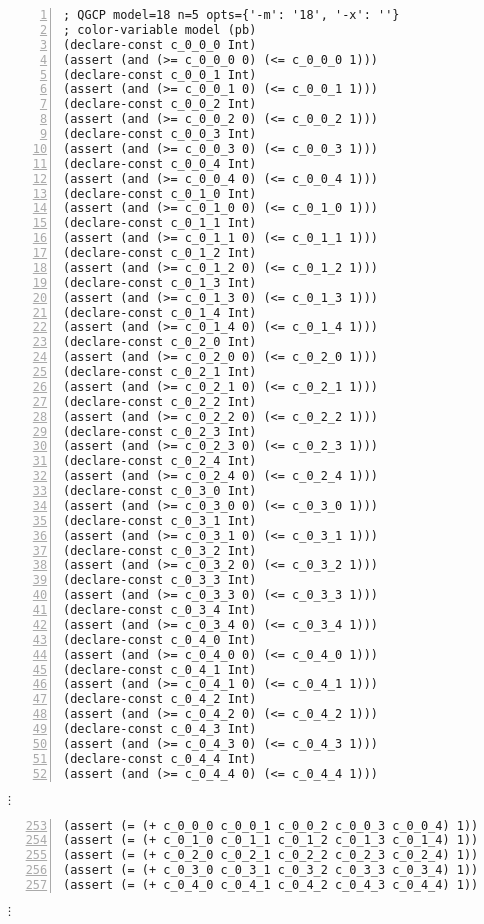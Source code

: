 \begin{lstlisting}[frame=trl,numbers=left,breaklines=true,%
columns=fullflexible,keepspaces=true,%
basicstyle=\ttfamily\scriptsize]
; QGCP model=18 n=5 opts={'-m': '18', '-x': ''}
; color-variable model (pb)
(declare-const c_0_0_0 Int)
(assert (and (>= c_0_0_0 0) (<= c_0_0_0 1)))
(declare-const c_0_0_1 Int)
(assert (and (>= c_0_0_1 0) (<= c_0_0_1 1)))
(declare-const c_0_0_2 Int)
(assert (and (>= c_0_0_2 0) (<= c_0_0_2 1)))
(declare-const c_0_0_3 Int)
(assert (and (>= c_0_0_3 0) (<= c_0_0_3 1)))
(declare-const c_0_0_4 Int)
(assert (and (>= c_0_0_4 0) (<= c_0_0_4 1)))
(declare-const c_0_1_0 Int)
(assert (and (>= c_0_1_0 0) (<= c_0_1_0 1)))
(declare-const c_0_1_1 Int)
(assert (and (>= c_0_1_1 0) (<= c_0_1_1 1)))
(declare-const c_0_1_2 Int)
(assert (and (>= c_0_1_2 0) (<= c_0_1_2 1)))
(declare-const c_0_1_3 Int)
(assert (and (>= c_0_1_3 0) (<= c_0_1_3 1)))
(declare-const c_0_1_4 Int)
(assert (and (>= c_0_1_4 0) (<= c_0_1_4 1)))
(declare-const c_0_2_0 Int)
(assert (and (>= c_0_2_0 0) (<= c_0_2_0 1)))
(declare-const c_0_2_1 Int)
(assert (and (>= c_0_2_1 0) (<= c_0_2_1 1)))
(declare-const c_0_2_2 Int)
(assert (and (>= c_0_2_2 0) (<= c_0_2_2 1)))
(declare-const c_0_2_3 Int)
(assert (and (>= c_0_2_3 0) (<= c_0_2_3 1)))
(declare-const c_0_2_4 Int)
(assert (and (>= c_0_2_4 0) (<= c_0_2_4 1)))
(declare-const c_0_3_0 Int)
(assert (and (>= c_0_3_0 0) (<= c_0_3_0 1)))
(declare-const c_0_3_1 Int)
(assert (and (>= c_0_3_1 0) (<= c_0_3_1 1)))
(declare-const c_0_3_2 Int)
(assert (and (>= c_0_3_2 0) (<= c_0_3_2 1)))
(declare-const c_0_3_3 Int)
(assert (and (>= c_0_3_3 0) (<= c_0_3_3 1)))
(declare-const c_0_3_4 Int)
(assert (and (>= c_0_3_4 0) (<= c_0_3_4 1)))
(declare-const c_0_4_0 Int)
(assert (and (>= c_0_4_0 0) (<= c_0_4_0 1)))
(declare-const c_0_4_1 Int)
(assert (and (>= c_0_4_1 0) (<= c_0_4_1 1)))
(declare-const c_0_4_2 Int)
(assert (and (>= c_0_4_2 0) (<= c_0_4_2 1)))
(declare-const c_0_4_3 Int)
(assert (and (>= c_0_4_3 0) (<= c_0_4_3 1)))
(declare-const c_0_4_4 Int)
(assert (and (>= c_0_4_4 0) (<= c_0_4_4 1)))
\end{lstlisting}
$\vdots$
\begin{lstlisting}[frame=rl,numbers=left,breaklines=true,%
columns=fullflexible,keepspaces=true,%
basicstyle=\ttfamily\scriptsize,firstnumber=253]
(assert (= (+ c_0_0_0 c_0_0_1 c_0_0_2 c_0_0_3 c_0_0_4) 1))
(assert (= (+ c_0_1_0 c_0_1_1 c_0_1_2 c_0_1_3 c_0_1_4) 1))
(assert (= (+ c_0_2_0 c_0_2_1 c_0_2_2 c_0_2_3 c_0_2_4) 1))
(assert (= (+ c_0_3_0 c_0_3_1 c_0_3_2 c_0_3_3 c_0_3_4) 1))
(assert (= (+ c_0_4_0 c_0_4_1 c_0_4_2 c_0_4_3 c_0_4_4) 1))
\end{lstlisting}
$\vdots$

